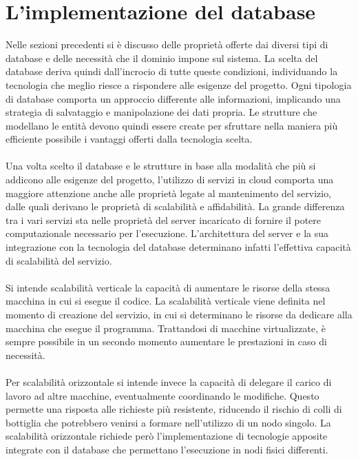 \section{L'implementazione del database}
Nelle sezioni precedenti si è discusso delle proprietà
offerte dai diversi tipi di database e
delle necessità che il dominio impone sul sistema.
La scelta del database deriva quindi dall'incrocio di tutte queste condizioni,
individuando la tecnologia che meglio riesce a rispondere alle esigenze del progetto.
Ogni tipologia di database comporta un approccio differente alle informazioni,
implicando una strategia di salvataggio e manipolazione dei dati propria.
Le strutture che modellano le entità devono quindi
essere create per sfruttare nella maniera più efficiente possibile
i vantaggi offerti dalla tecnologia scelta.\\
\\
Una volta scelto il database e le strutture in base alla modalità
che più si addicono alle esigenze del progetto,
l'utilizzo di servizi in cloud comporta una maggiore attenzione anche
alle proprietà legate al mantenimento del servizio,
dalle quali derivano le proprietà di scalabilità e affidabilità.
La grande differenza tra i vari servizi sta nelle proprietà del server
incaricato di fornire il potere computazionale necessario per l’esecuzione.
L’architettura del server e la sua integrazione con la tecnologia del database
determinano infatti l’effettiva capacità di scalabilità del servizio.\\
\\
Si intende scalabilità verticale la capacità di aumentare le risorse
della stessa macchina in cui si esegue il codice.
La scalabilità verticale viene definita nel momento di creazione del servizio,
in cui si determinano le risorse da dedicare alla macchina che esegue il programma.
Trattandosi di macchine virtualizzate,
è sempre possibile in un secondo momento aumentare le prestazioni in caso di necessità.\\
\\
Per scalabilità orizzontale si intende invece la capacità di
delegare il carico di lavoro ad altre macchine, eventualmente coordinando le modifiche.
Questo permette una risposta alle richieste più resistente,
riducendo il rischio di colli di bottiglia che potrebbero venirsi a formare nell’utilizzo di un nodo singolo.
La scalabilità orizzontale richiede però l'implementazione
di tecnologie apposite integrate con il database che permettano l'esecuzione in nodi fisici differenti. \\
